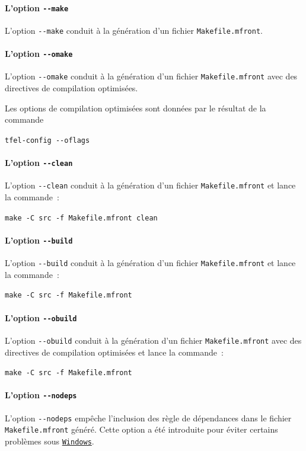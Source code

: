 \documentclass[rectoverso,pleiades,pstricks,leqno,anti]{texmf/note_technique_2010}
\newcommand{\moption}[1]{\texttt{-{}-#1}}
\newcommand{\windows}{\href{http://www.microsoft.com/france/windows/default.mspx}{\texttt{Windows}}}
\begin{document}
\paragraph{L'option \moption{make}} L'option \moption{make} conduit à la
génération d'un fichier {\tt Makefile.mfront}.

\paragraph{L'option \moption{omake}} L'option \moption{omake} conduit à la
génération d'un fichier {\tt Makefile.mfront} avec des directives de
compilation optimisées.

Les options de compilation optimisées sont données par le résultat de la
commande~
\begin{center}
  {\tt tfel-config -{}-oflags}
\end{center}

\paragraph{L'option \moption{clean}} L'option \moption{clean} conduit à la
génération d'un fichier {\tt Makefile.mfront} et lance la commande~:
\begin{center}
  {\tt make -C src -f Makefile.mfront clean}
\end{center}

\paragraph{L'option \moption{build}} L'option \moption{build} conduit à la
génération d'un fichier {\tt Makefile.mfront} et lance la commande~:
\begin{center}
  {\tt make -C src -f Makefile.mfront}
\end{center}

\paragraph{L'option \moption{obuild}} L'option \moption{obuild} conduit à la
génération d'un fichier {\tt Makefile.mfront} avec des directives de
compilation optimisées et lance la commande~:
\begin{center}
  {\tt make -C src -f Makefile.mfront}
\end{center}

\paragraph{L'option \moption{nodeps}} L'option \moption{nodeps} empêche
l'inclusion des règle de dépendances dans le fichier {\tt
  Make\-file\-.mfront} généré. Cette option a été introduite pour éviter
certains problèmes sous \windows{}.
\end{document}
